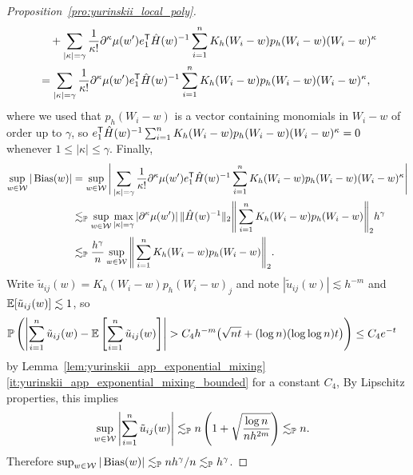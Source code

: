 \begin{proof}[Proposition~\ref{pro:yurinskii_local_poly}]
\begin{align*}
    &\quad+
    \sum_{|\kappa|=\gamma}
    \frac{1}{\kappa!}
    \partial^{\kappa} \mu(w')
    e_1^{\mathsf{T}} \hat H(w)^{-1}
    \sum_{i=1}^n K_h(W_i-w) p_h(W_i-w)
    (W_i-w)^\kappa \\
    &=
    \sum_{|\kappa|=\gamma}
    \frac{1}{\kappa!}
    \partial^{\kappa} \mu(w')
    e_1^{\mathsf{T}} \hat H(w)^{-1}
    \sum_{i=1}^n K_h(W_i-w) p_h(W_i-w)
    (W_i-w)^\kappa,
  \end{align*}
  where we used that
  $p_h(W_i-w)$ is a vector containing monomials
  in $W_i-w$ of order up to $\gamma$, so
  $e_1^{\mathsf{T}} \hat H(w)^{-1}
  \sum_{i=1}^n K_h(W_i-w) p_h(W_i-w)
  (W_i-w)^\kappa = 0$
  whenever $1 \leq |\kappa| \leq \gamma$.
  Finally,
  \begin{align*}
    \sup_{w\in\mathcal{W}}
    |\operatorname{Bias}(w)|
    &=
    \sup_{w\in\mathcal{W}}
    \Bigg|
    \sum_{|\kappa|=\gamma}
    \frac{1}{\kappa!}
    \partial^{\kappa} \mu(w')
    e_1^{\mathsf{T}} \hat H(w)^{-1}
    \sum_{i=1}^n K_h(W_i-w) p_h(W_i-w)
    (W_i-w)^\kappa
    \Bigg| \\
    &\lesssim_{\mathbb{P}}
    \sup_{w\in\mathcal{W}}
    \max_{|\kappa| = \gamma}
    \left|
    \partial^{\kappa} \mu(w')
    \right|
    \|\hat H(w)^{-1}\|_2
    \Bigg\|
    \sum_{i=1}^n K_h(W_i-w) p_h(W_i-w)
    \Bigg\|_2
    h^\gamma \\
    &\lesssim_{\mathbb{P}}
    \frac{h^\gamma}{n}
    \sup_{w\in\mathcal{W}}
    \Bigg\|
    \sum_{i=1}^n K_h(W_i-w) p_h(W_i-w)
    \Bigg\|_2.
  \end{align*}
  Write
  $\tilde u_{i j}(w) = K_h(W_i-w)p_h(W_i-w)_j$
  and note $|\tilde u_{i j}(w)| \lesssim h^{-m}$
  and $\mathbb{E}[\tilde u_{i j}(w)] \lesssim 1$, so
  \begin{align*}
    \mathbb{P}\left(
      \left|
      \sum_{i=1}^n \tilde u_{i j}(w)
      - \mathbb{E}\left[
        \sum_{i=1}^n \tilde u_{i j}(w)
      \right]
      \right|
      > C_4 h^{-m} \big( \sqrt{n t}
      + (\log n)(\log \log n) t \big)
    \right)
    &\leq
    C_4 e^{-t}
  \end{align*}
  by Lemma~\ref{lem:yurinskii_app_exponential_mixing}%
  \ref{it:yurinskii_app_exponential_mixing_bounded} for a constant $C_4$,
  By Lipschitz properties, this implies
  \begin{align*}
    \sup_{w \in \mathcal{W}}
    \left|
    \sum_{i=1}^n \tilde u_{i j}(w)
    \right|
    &\lesssim_{\mathbb{P}}
    n
    \left(
      1 + \sqrt{\frac{\log n}{n h^{2m}}}
    \right)
    \lesssim_{\mathbb{P}}
    n.
  \end{align*}
  Therefore
  $\sup_{w\in\mathcal{W}} |\operatorname{Bias}(w)|
  \lesssim_{\mathbb{P}} n h^\gamma / n
  \lesssim_{\mathbb{P}} h^\gamma$.


\end{proof}

